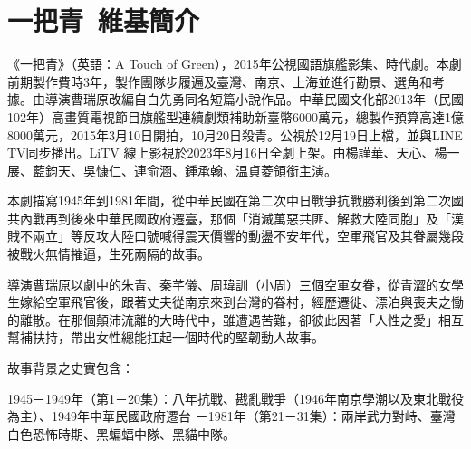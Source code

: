 \section*{一把青~維基簡介}
《一把青》（英語：A Touch of Green），2015年公視國語旗艦影集、時代劇。本劇前期製作費時3年，製作團隊步履遍及臺灣、南京、上海並進行勘景、選角和考據。由導演曹瑞原改編自白先勇同名短篇小說作品。中華民國文化部2013年（民國102年）高畫質電視節目旗艦型連續劇類補助新臺幣6000萬元，總製作預算高達1億8000萬元，2015年3月10日開拍，10月20日殺青。公視於12月19日上檔，並與LINE TV同步播出。LiTV 線上影視於2023年8月16日全劇上架。由楊謹華、天心、楊一展、藍鈞天、吳慷仁、連俞涵、鍾承翰、温貞菱領銜主演。

本劇描寫1945年到1981年間，從中華民國在第二次中日戰爭抗戰勝利後到第二次國共內戰再到後來中華民國政府遷臺，那個「消滅萬惡共匪、解救大陸同胞」及「漢賊不兩立」等反攻大陸口號喊得震天價響的動盪不安年代，空軍飛官及其眷屬幾段被戰火無情摧逼，生死兩隔的故事。

導演曹瑞原以劇中的朱青、秦芊儀、周瑋訓（小周）三個空軍女眷，從青澀的女學生嫁給空軍飛官後，跟著丈夫從南京來到台灣的眷村，經歷遷徙、漂泊與喪夫之慟的離散。在那個顛沛流離的大時代中，雖遭遇苦難，卻彼此因著「人性之愛」相互幫補扶持，帶出女性總能扛起一個時代的堅韌動人故事。

故事背景之史實包含：

1945－1949年（第1－20集）：八年抗戰、戡亂戰爭（1946年南京學潮以及東北戰役為主）、1949年中華民國政府遷台
－1981年（第21－31集）：兩岸武力對峙、臺灣白色恐怖時期、黑蝙蝠中隊、黑貓中隊。